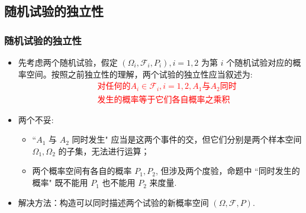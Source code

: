 \subsection{随机试验的独立性}
 \begin{frame}
              \frametitle{随机试验的独立性}

               \begin{itemize}[<+-|alert@+>]
               \item 先考虑两个随机试验，假定 $(\Omega_i,\mathcal{F}_i,P_i), i=1,2$ 为第 $i$ 个随机试验对应的概率空间。按照之前独立性的理解，两个试验的独立性应当叙述为:\pause
                \textcolor{red}{ \begin{eqnarray*}
                   &&\mbox{对任何的} A_i\in\mathcal{F}_i, i=1,2, A_1\mbox{与} A_2\mbox{同时}\\
                   &&\mbox{发生的概率等于它们各自概率之乘积}
                 \end{eqnarray*}}
             \item 两个不妥:
               \begin{itemize}[<+-|alert@+>]
               \item ``$A_1$ 与 $A_2$ 同时发生" 应当是这两个事件的交，但它们分别是两个样本空间 $\Omega_1,\Omega_2$ 的子集，无法进行运算；
               \item 两个概率空间有各自的概率 $P_1, P_2$, 但涉及两个度验，命题中 ``同时发生的概率" 既不能用 $P_1$ 也不能用 $P_2$ 来度量.
               \end{itemize}
             \item 解决方法：构造可以同时描述两个试验的新概率空间 $(\Omega,\mathcal{F},P)$.
               \end{itemize}
             \end{frame}

